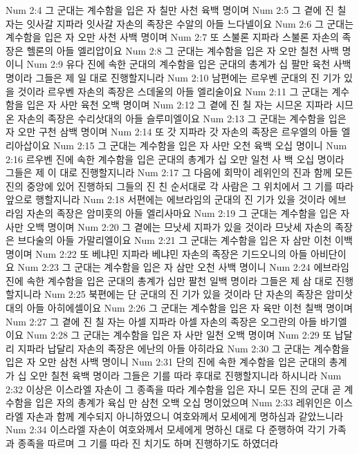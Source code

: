 Num 2:4  그 군대는 계수함을 입은 자 칠만 사천 육백 명이며
Num 2:5  그 곁에 진 칠 자는 잇사갈 지파라 잇사갈 자손의 족장은 수알의 아들 느다넬이요
Num 2:6  그 군대는 계수함을 입은 자 오만 사천 사백 명이며
Num 2:7  또 스불론 지파라 스불론 자손의 족장은 헬론의 아들 엘리압이요
Num 2:8  그 군대는 계수함을 입은 자 오만 칠천 사백 명이니
Num 2:9  유다 진에 속한 군대의 계수함을 입은 군대의 총계가 십 팔만 육천 사백 명이라 그들은 제 일 대로 진행할지니라
Num 2:10  남편에는 르우벤 군대의 진 기가 있을 것이라 르우벤 자손의 족장은 스데울의 아들 엘리술이요
Num 2:11  그 군대는 계수함을 입은 자 사만 육천 오백 명이며
Num 2:12  그 곁에 진 칠 자는 시므온 지파라 시므온 자손의 족장은 수리삿대의 아들 슬루미엘이요
Num 2:13  그 군대는 계수함을 입은 자 오만 구천 삼백 명이며
Num 2:14  또 갓 지파라 갓 자손의 족장은 르우엘의 아들 엘리아삽이요
Num 2:15  그 군대는 계수함을 입은 자 사만 오천 육백 오십 명이니
Num 2:16  르우벤 진에 속한 계수함을 입은 군대의 총계가 십 오만 일천 사 백 오십 명이라 그들은 제 이 대로 진행할지니라
Num 2:17  그 다음에 회막이 레위인의 진과 함께 모든 진의 중앙에 있어 진행하되 그들의 진 친 순서대로 각 사람은 그 위치에서 그 기를 따라 앞으로 행할지니라
Num 2:18  서편에는 에브라임의 군대의 진 기가 있을 것이라 에브라임 자손의 족장은 암미훗의 아들 엘리사마요
Num 2:19  그 군대는 계수함을 입은 자 사만 오백 명이며
Num 2:20  그 곁에는 므낫세 지파가 있을 것이라 므낫세 자손의 족장은 브다술의 아들 가말리엘이요
Num 2:21  그 군대는 계수함을 입은 자 삼만 이천 이백 명이며
Num 2:22  또 베냐민 지파라 베냐민 자손의 족장은 기드오니의 아들 아비단이요
Num 2:23  그 군대는 계수함을 입은 자 삼만 오천 사백 명이니
Num 2:24  에브라임 진에 속한 계수함을 입은 군대의 총계가 십만 팔천 일백 명이라 그들은 제 삼 대로 진행할지니라
Num 2:25  북편에는 단 군대의 진 기가 있을 것이라 단 자손의 족장은 암미삿대의 아들 아히에셀이요
Num 2:26  그 군대는 계수함을 입은 자 육만 이천 칠백 명이며
Num 2:27  그 곁에 진 칠 자는 아셀 지파라 아셀 자손의 족장은 오그란의 아들 바기엘이요
Num 2:28  그 군대는 계수함을 입은 자 사만 일천 오백 명이며
Num 2:29  또 납달리 지파라 납달리 자손의 족장은 에난의 아들 아히라요
Num 2:30  그 군대는 계수함을 입은 자 오만 삼천 사백 명이니
Num 2:31  단의 진에 속한 계수함을 입은 군대의 총계가 십 오만 칠천 육백 명이라 그들은 기를 따라 후대로 진행할지니라 하시니라
Num 2:32  이상은 이스라엘 자손이 그 종족을 따라 계수함을 입은 자니 모든 진의 군대 곧 계수함을 입은 자의 총계가 육십 만 삼천 오백 오십 명이었으며
Num 2:33  레위인은 이스라엘 자손과 함께 계수되지 아니하였으니 여호와께서 모세에게 명하심과 같았느니라
Num 2:34  이스라엘 자손이 여호와께서 모세에게 명하신 대로 다 준행하여 각기 가족과 종족을 따르며 그 기를 따라 진 치기도 하며 진행하기도 하였더라
